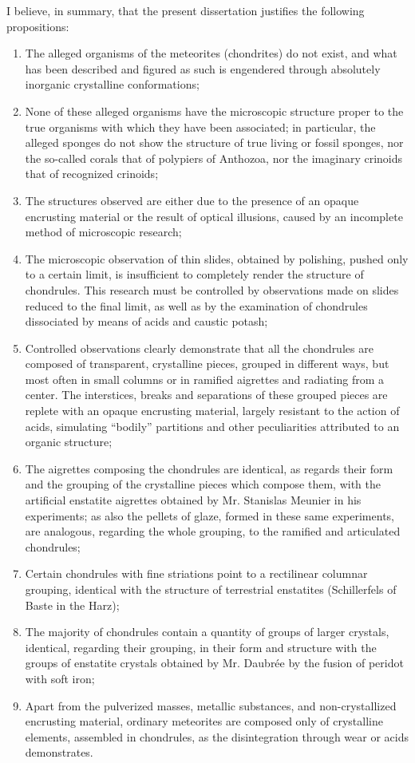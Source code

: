 \documentclass[a4paper, 12pt, oneside]{article}
\begin{document}
I believe, in summary, that the present dissertation justifies the following propositions:
\begin{enumerate}
\item The alleged organisms of the meteorites (chondrites) do not exist, and what has been described and figured as such is engendered through absolutely inorganic crystalline conformations;
\item None of these alleged organisms have the microscopic structure proper to the true organisms with which they have been associated; in particular, the alleged sponges do not show the structure of true living or fossil sponges, nor the so-called corals that of polypiers of Anthozoa, nor the imaginary crinoids that of recognized crinoids;
\item The structures observed are either due to the presence of an opaque encrusting material or the result of optical illusions, caused by an incomplete method of microscopic research;
\item The microscopic observation of thin slides, obtained by polishing, pushed only to a certain limit, is insufficient to completely render the structure of chondrules. This research must be controlled by observations made on slides reduced to the final limit, as well as by the examination of chondrules dissociated by means of acids and caustic potash;
\item Controlled observations clearly demonstrate that all the chondrules are composed of transparent, crystalline pieces, grouped in different ways, but most often in small columns or in ramified aigrettes and radiating from a center. The interstices, breaks and separations of these grouped pieces are replete with an opaque encrusting material, largely resistant to the action of acids, simulating ``bodily'' partitions and other peculiarities attributed to an organic structure;
\item The aigrettes composing the chondrules are identical, as regards their form and the grouping of the crystalline pieces which compose them, with the artificial enstatite aigrettes obtained by Mr. Stanislas Meunier in his experiments; as also the pellets of glaze, formed in these same experiments, are analogous, regarding the whole grouping, to the ramified and articulated chondrules;
\item Certain chondrules with fine striations point to a rectilinear columnar grouping, identical with the structure of terrestrial enstatites (Schillerfels of Baste in the Harz);
\item The majority of chondrules contain a quantity of groups of larger crystals, identical, regarding their grouping, in their form and structure with the groups of enstatite crystals obtained by Mr. Daubrée by the fusion of peridot with soft iron;
\item Apart from the pulverized masses, metallic substances, and non-crystallized encrusting material, ordinary meteorites are composed only of crystalline elements, assembled in chondrules, as the disintegration through wear or acids demonstrates.
\end{enumerate}
\end{document}
